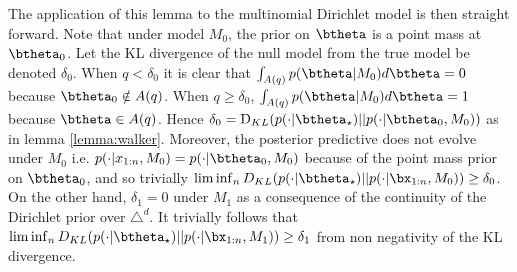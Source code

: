 \documentclass[11pt]{article}
\newcommand{\KL}{\mathrm{D}_{KL}}
\begin{document}
The application of this lemma to the multinomial Dirichlet model is then straight forward.
Note that under model $M_0$, the prior on $\btheta$ is a point mass at $\btheta_0$.
Let the KL divergence of the null model from the true model be denoted $\delta_0$. When $q<\delta_0$ it is clear that $\int_{A(q)} p(\btheta|M_0) d\btheta = 0$ because $\btheta_0 \notin A(q)$. When $q\geq \delta_0$, $\int_{A(q)} p(\btheta|M_0) d\btheta = 1$ because $\btheta \in A(q)$. 
Hence $\delta_0 = \KL (p(\cdot|\btheta_\star) || p(\cdot|\btheta_0, M_0))$ as in lemma \ref{lemma:walker}.
Moreover, the posterior predictive does not evolve under $M_0$ i.e. $p(\cdot|x_{1:n},M_0) = p(\cdot|\btheta_0,M_0)$ because of the point mass prior on $\btheta_0$, and so 
trivially  $\lim \inf_n D_{KL}(p(\cdot|\btheta_\star)||p(\cdot|\bx_{1:n}, M_0) ) \geq \delta_0$. 
On the other hand, $\delta_1 = 0$ under $M_1$ as a consequence of the continuity of the Dirichlet prior over $\triangle^d$.
It trivially follows that $\lim \inf_n D_{KL}(p(\cdot|\btheta_\star)||p(\cdot|\bx_{1:n}, M_1) ) \geq \delta_1$ from non negativity of the KL divergence.
\end{document}
